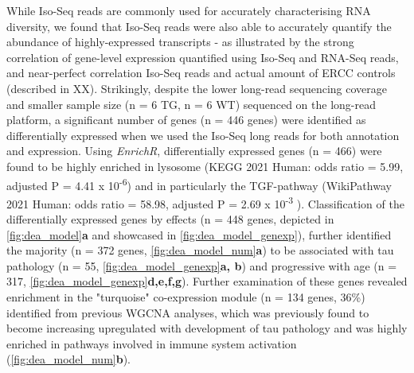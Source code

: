 While Iso-Seq reads are commonly used for accurately characterising RNA diversity, we found that Iso-Seq reads were also able to accurately quantify the abundance of highly-expressed transcripts - as illustrated by the strong correlation of gene-level expression quantified using Iso-Seq and RNA-Seq reads, and near-perfect correlation Iso-Seq reads and actual amount of ERCC controls (described in XX). Strikingly, despite the lower long-read sequencing coverage and smaller sample size (n = 6 TG, n = 6 WT) sequenced on the long-read platform, a significant number of genes (n = 446 genes) were identified as differentially expressed when we used the Iso-Seq long reads for both annotation and expression. Using \textit{EnrichR}, differentially expressed genes (n = 466) were found to be highly enriched in lysosome (KEGG 2021 Human: odds ratio = 5.99, adjusted P = 4.41 x 10\textsuperscript{-6}) and in particularly the TGF-\textbeta pathway (WikiPathway 2021 Human: odds ratio = 58.98, adjusted P = 2.69 x 10\textsuperscript{-3} ). Classification of the differentially expressed genes by effects (n = 448 genes, depicted in \cref{fig:dea_model}\textbf{a} and showcased in \cref{fig:dea_model_genexp}), further identified the majority (n = 372 genes, \cref{fig:dea_model_num}\textbf{a}) to be associated with tau pathology (n = 55, \cref{fig:dea_model_genexp}\textbf{a, b}) and progressive with age (n = 317, \cref{fig:dea_model_genexp}\textbf{d,e,f,g}). Further examination of these genes revealed enrichment in the "turquoise" co-expression module (n = 134 genes, 36\%) identified from previous WGCNA analyses, which was previously found to become increasing upregulated with development of tau pathology and was highly enriched in pathways involved in immune system activation\cite{Castanho2020} (\cref{fig:dea_model_num}\textbf{b}).  
 
